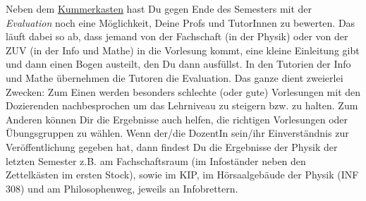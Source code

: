 \newpage{}
\label{eval}

\noindent Neben dem \hyperref[kummerkasten]{Kummerkasten} hast Du gegen Ende des Semesters mit der \emph{Evaluation} noch eine Möglichkeit, Deine Profs und TutorInnen zu bewerten. Das läuft dabei so ab, dass jemand von der Fachschaft (in der Physik) oder von der ZUV (in der Info und Mathe) in die Vorlesung kommt, eine kleine Einleitung gibt und dann einen Bogen austeilt, den Du dann ausfüllst. In den Tutorien der Info und Mathe übernehmen die Tutoren die Evaluation. Das ganze dient zweierlei Zwecken: Zum Einen werden besonders schlechte (oder gute) Vorlesungen mit den Dozierenden nachbesprochen um das Lehrniveau zu steigern bzw. zu halten. Zum Anderen können Dir die Ergebnisse auch helfen, die richtigen Vorlesungen oder Übungsgruppen zu wählen. Wenn der/die DozentIn sein/ihr Einverständnis zur Veröffentlichung gegeben hat, dann findest Du die Ergebnisse der Physik der letzten Semester z.B. am Fachschaftsraum (im Infoständer neben den Zettelkästen im ersten Stock), sowie im \gls{KIP}, im Hörsaalgebäude der Physik (\Gls{INF} 308) und am Philosophenweg, jeweils an Infobrettern.

